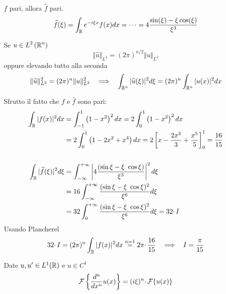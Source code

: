$f$ pari, allora $\hat{f}$ pari.
\begin{equation*}
\widehat{f}( \xi ) =\int _{\mathbb{R} } e^{-i\xi x} f( x) dx=\cdots=4\frac{\sin( \xi ) -\xi \cos( \xi )}{\xi ^{3}}
\end{equation*}
\begin{thm}
 Se $\displaystyle u\in L^{2}\left(\mathbb{R} ^{n}\right)$
\begin{equation*}
\Vert \hat{u}\Vert _{L^{2}} =( 2\pi )^{n/2}\Vert u\Vert _{L^{2}}
\end{equation*}
oppure elevando tutto alla seconda
\begin{equation*}
\Vert \hat{u}\Vert ^{2}_{L^{2}} =( 2\pi )^{n}\Vert u\Vert ^{2}_{L^{2}} \ \ \implies \ \ \int _{\RR ^{n}}| \hat{u}( \xi )| ^{2} d\xi =( 2\pi )^{n}\int _{\RR ^{n}}| u( x)| ^{2} dx
\end{equation*}
\end{thm}
Sfrutto il fatto che $f$ e $\hat{f}$ sono pari:
\begin{align*}
\int _{\mathbb{R} }| f( x)| ^{2} dx & =\int ^{1}_{-1}\left( 1-x^{2}\right)^{2} dx=2\int ^{1}_{0}\left( 1-x^{2}\right)^{2} dx\\
 & =2\int ^{1}_{0}\left( 1-2x^2+x^{4}\right) dx=2\left[ x-\frac{2x^{3}}{3} +\frac{x^{5}}{5}\right]^{1}_{0} =\frac{16}{15}\\
 & \\
\int _{\mathbb{R} }| \widehat{f}( \xi )| ^{2} d\xi  & =\int ^{+\infty }_{-\infty }\left| 4\frac{(\sin \xi -\xi \ \cos \xi )}{\xi ^{3}}\right| ^{2} d\xi \\
 & =16\int ^{+\infty }_{-\infty }\frac{(\sin \xi -\xi \ \cos \xi )^{2}}{\xi ^{6}} d\xi \\
 & =32\int ^{+\infty }_{0}\frac{(\sin \xi -\xi \ \cos \xi )^{2}}{\xi ^{6}} d\xi =32\cdotp I
\end{align*}
Usando Plancherel
\begin{equation*}
32\cdotp I=( 2\pi )^{n}\int _{\RR }| f( x)| ^{2} dx\overset{n=1}{=} 2\pi \cdotp \frac{16}{15} \ \ \implies \ \ I=\frac{\pi }{15}
\end{equation*}
\Soluzione
\begin{thm}
 Date $u,u'\in L^{1}(\mathbb{R} )$ e $u\in C^{1}$
\begin{equation*}
\mathcal{F} \left\{\frac{d^{n}}{dx^{n}} u( x)\right\} =( i\xi )^{n} \cdotp \mathcal{F} \{u( x)\}
\end{equation*}
\end{thm}
